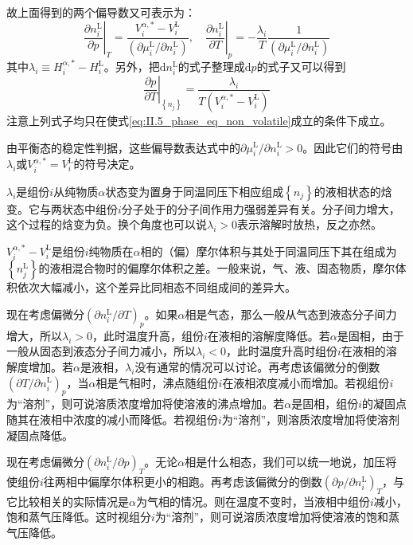 \documentclass[main.tex]{subfiles}
\begin{document}
故上面得到的两个偏导数又可表示为：
\[\left.\frac{\partial n_i^\text{L}}{\partial p}\right|_{T}=\frac{V_i^{\alpha,*}-V_i^\text{L}}{\left(\partial \mu_i^\text{L}/\partial n_i^\text{L}\right)},\quad\left.\frac{\partial n_i^\text{L}}{\partial T}\right|_{p}=-\frac{\lambda_i}{T}\frac{1}{\left(\partial\mu_i^\text{L}/\partial n_i^\text{L}\right)}\]
其中$\lambda_i\equiv H_i^{\alpha,*}-H_i^\text{L}$。另外，把$\mathrm{d}n_i^\text{L}$的式子整理成$\mathrm{d}p$的式子又可以得到
\[\left.\frac{\partial p}{\partial T}\right|_{\left\{n_j\right\}}=\frac{\lambda_i}{T\left(V_i^{\alpha,*}-V_i^\text{L}\right)}\]
注意上列式子均只在使式\eqref{eq:II.5_phase_eq_non_volatile}成立的条件下成立。

由平衡态的稳定性判据，这些偏导数表达式中的$\partial\mu_i^\text{L}/\partial n_i^\text{L}>0$。因此它们的符号由$\lambda_i$或$V_i^{\alpha,*}=V_i^\text{L}$的符号决定。

$\lambda_i$是组份$i$从纯物质$\alpha$状态变为置身于同温同压下相应组成$\left\{n_j\right\}$的液相状态的焓变。它与两状态中组份$i$分子处于的分子间作用力强弱差异有关。分子间力增大，这个过程的焓变为负。换个角度也可以说$\lambda_i>0$表示溶解时放热，反之亦然。

$V_i^{\alpha,*}-V_i^\text{L}$是组份$i$纯物质在$\alpha$相的（偏）摩尔体积与其处于同温同压下其在组成为$\left\{n_j^\text{L}\right\}$的液相混合物时的偏摩尔体积之差。一般来说，气、液、固态物质，摩尔体积依次大幅减小，这个差异比同相态不同组成间的差异大。

现在考虑偏微分$\left(\partial n_i^\text{L}/\partial T\right)_{p}$。如果$\alpha$相是气态，那么一般从气态到液态分子间力增大，所以$\lambda_i>0$，此时温度升高，组份$i$在液相的溶解度降低。若$\alpha$是固相，由于一般从固态到液态分子间力减小，所以$\lambda_i<0$，此时温度升高时组份$i$在液相的溶解度增加。若$\alpha$是液相，$\lambda_i$没有通常的情况可以讨论。再考虑该偏微分的倒数$\left(\partial T/\partial n_i^\text{L}\right)_p$，当$\alpha$相是气相时，沸点随组份$i$在液相浓度减小而增加。若视组份$i$为“溶剂”，则可说溶质浓度增加将使溶液的沸点增加。若$\alpha$是固相，组份$i$的凝固点随其在液相中浓度的减小而降低。若视组份$i$为“溶剂”，则溶质浓度增加将使溶剂凝固点降低。

现在考虑偏微分$\left(\partial n_i^\text{L}/\partial p\right)_T$。无论$\alpha$相是什么相态，我们可以统一地说，加压将使组份$i$往两相中偏摩尔体积更小的相跑。再考虑该偏微分的倒数$\left(\partial p/\partial n_i^\text{L}\right)_T$，与它比较相关的实际情况是$\alpha$为气相的情况。则在温度不变时，当液相中组份$i$减小，饱和蒸气压降低。这时视组分$i$为“溶剂”，则可说溶质浓度增加将使溶液的饱和蒸气压降低。
\end{document}
